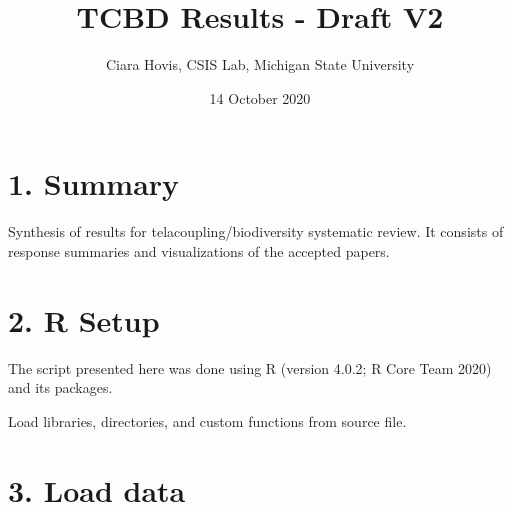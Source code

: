 \documentclass[
]{article}
\title{TCBD Results - Draft V2}
\author{Ciara Hovis, CSIS Lab, Michigan State University}
\date{14 October 2020}
\begin{document}
\maketitle

{
\setcounter{tocdepth}{4}
\tableofcontents
}
\hypertarget{summary}{%
\section{1. Summary}\label{summary}}

Synthesis of results for telacoupling/biodiversity systematic review. It
consists of response summaries and visualizations of the accepted
papers.

\hypertarget{r-setup}{%
\section{2. R Setup}\label{r-setup}}

The script presented here was done using R (version 4.0.2; R Core Team
2020) and its packages.

Load libraries, directories, and custom functions from source file.

\hypertarget{load-data}{%
\section{3. Load data}\label{load-data}}
\end{document}

